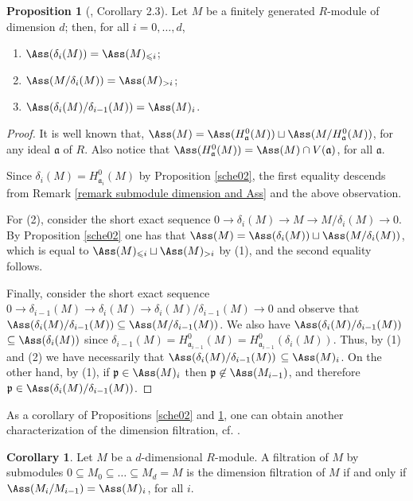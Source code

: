 \documentclass[12pt]{amsart}
\theoremstyle{definition}
\newtheorem{corollary}[theorem]{Corollary}
\newtheorem{proposition}[theorem]{Proposition}
\theoremstyle{definition}
\def\frk{\mathfrak}               %
\def\aa{{\frk a}}
\def\pp{{\frk p}}
\renewcommand{\leq}{\leqslant}
\let\lra\longrightarrow
\begin{document}
 \begin{proposition}[\cite{Sch99}, Corollary 2.3]\label{assass} Let $M$ be a finitely generated $R$-module of dimension $d$; then, for all $i=0,\ldots,d$,  
    \begin{enumerate}[(1)]
    \item $\Ass(\delta_i(M))=\Ass(M)_{\leq i}$;
    \item $\Ass(M/\delta_i(M))=\Ass(M)_{>i}$;
    \item $\Ass(\delta_i(M)/\delta_{i-1}(M))=\Ass(M)_i$.
    \end{enumerate}
    
\end{proposition}
 \begin{proof} It is well known that,   $\Ass(M)=\Ass(H^0_\aa(M))\sqcup \Ass(M/H^0_\aa(M))$, for any ideal $\aa$ of $R$. Also notice that $\Ass(H^0_{\aa}(M))=\Ass(M)\cap V(\aa)$, for all $\aa$.

   \smallskip
   \noindent
Since $\delta_i(M)= H^0_{\aa_i}(M)$ by Proposition \ref{sche02}, the first equality descends from  Remark \ref{remark submodule dimension and Ass} and the above observation.
    
For (2), consider the short exact sequence $0 \lra \delta_i(M) \lra M \lra M/\delta_i(M) \lra 0$. By Proposition \ref{sche02}  one has that $\Ass(M)=\Ass(\delta_i(M))\sqcup \Ass(M/\delta_i(M))$, which is equal to $\Ass(M)_{\leq i}\sqcup\Ass(M)_{>i}$ by (1), and the second equality follows.
    
Finally, consider the short exact sequence  $0 \to \delta_{i-1}(M) \to \delta_i(M) \to \delta_i(M)/\delta_{i-1}(M)\to 0$ and observe that  $\Ass(\delta_i(M)/\delta_{i-1}(M))\subseteq  \Ass(M/\delta_{i-1}(M))$. We also have $\Ass(\delta_i(M)/\delta_{i-1}(M))$ $\subseteq \Ass(\delta_i(M))$ since $\delta_{i-1}(M)=H^0_{\aa_{i-1}}(M)=H^0_{\aa_{i-1}}(\delta_i(M))$. Thus, by (1) and (2) we have necessarily that $\Ass(\delta_i(M)/\delta_{i-1}(M))$ $\subseteq \Ass(M)_i$. On the other hand, by (1), if $\pp\in\Ass(M)_i$ then $\pp\not\in\Ass(M_{i-1})$, and therefore $\pp\in\Ass(\delta_i(M)/\delta_{i-1}(M))$.  
   \end{proof}

\noindent As a corollary of Propositions \ref{sche02} and \ref{assass}, one can  obtain another characterization of the dimension filtration, cf. \cite [Proposition 1.1]{HP06}.
  
  \begin{corollary}\label{hepo1.1}
    Let $M$ be a $d$-dimensional $R$-module.  A filtration of $M$ by submodules $0 \subseteq M_0 \subseteq \ldots \subseteq M_d=M$ is the dimension filtration of $M$ if and only if  $\Ass(M_i/M_{i-1})=\Ass(M)_i$, for all $i$. 
  \end{corollary}
  
\end{document}
